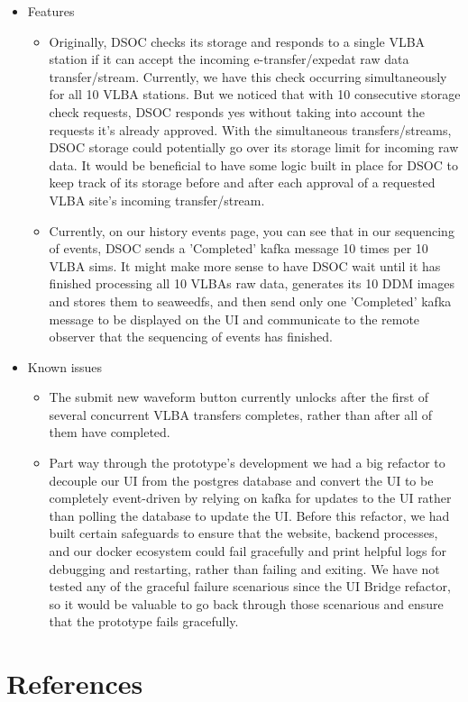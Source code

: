 \documentclass[12pt]{article}
\begin{document}
\begin{itemize}
  \item Features
  \begin{itemize}
    
    \item Originally, DSOC checks its storage and responds to a single VLBA station if it can accept the incoming e-transfer/expedat raw data transfer/stream. Currently, we have this check occurring simultaneously for all 10 VLBA stations. But we noticed that with 10 consecutive storage check requests, DSOC responds yes without taking into account the requests it’s already approved. With the simultaneous transfers/streams, DSOC storage could potentially go over its storage limit for incoming raw data. It would be beneficial to have some logic built in place for DSOC to keep track of its storage before and after each approval of a requested VLBA site's incoming transfer/stream.
    
    \item Currently, on our history events page, you can see that in our sequencing of events, DSOC sends a 'Completed' kafka message 10 times per 10 VLBA sims. It might make more sense to have DSOC wait until it has finished processing all 10 VLBAs raw data, generates its 10 DDM images and stores them to seaweedfs, and then send only one 'Completed' kafka message to be displayed on the UI and communicate to the remote observer that the sequencing of events has finished. 
  
  \end{itemize}
  
  \item Known issues
  \begin{itemize}
    
    \item The submit new waveform button currently unlocks after the first of several concurrent VLBA transfers completes, rather than after all of them have completed.
    \item Part way through the prototype's development we had a big refactor to decouple our UI from the postgres database and convert the UI to be completely event-driven by relying on kafka for updates to the UI rather than polling the database to update the UI. Before this refactor, we had built certain safeguards to ensure that the website, backend processes, and our docker ecosystem could fail gracefully and print helpful logs for debugging and restarting, rather than failing and exiting. We have not tested any of the graceful failure scenarious since the UI Bridge refactor, so it would be valuable to go back through those scenarious and ensure that the prototype fails gracefully. 

  \end{itemize}
\end{itemize}

\section{References}
\end{document}
